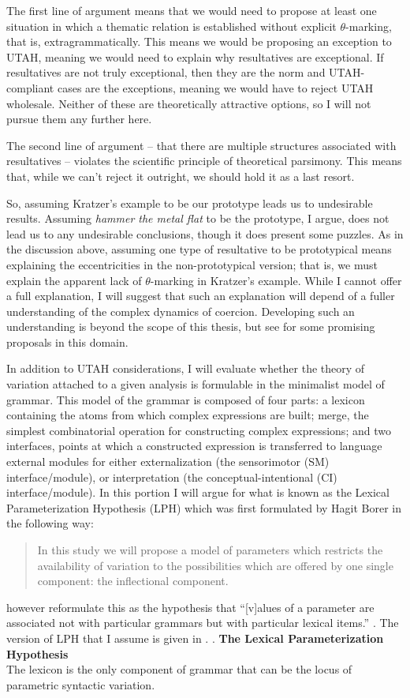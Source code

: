 \documentclass[MilwayThesis]{subfiles}
\begin{document}
The first line of argument means that we would need to propose at least one situation in which a thematic relation is established without explicit $\theta$-marking, that is, extragrammatically.
This means we would be proposing an exception to UTAH, meaning we would need to explain why resultatives are exceptional.
If resultatives are not truly exceptional, then they are the norm and UTAH-compliant cases are the exceptions, meaning we would have to reject UTAH wholesale.
Neither of these are theoretically attractive options, so I will not pursue them any further here.

The second line of argument -- that there are multiple structures associated with resultatives -- violates the scientific principle of theoretical parsimony.
This means that, while we can't reject it outright, we should hold it as a last resort.

So, assuming Kratzer's example to be our prototype leads us to undesirable results.
Assuming \textit{hammer the metal flat} to be the prototype, I argue, does not lead us to any undesirable conclusions, though it does present some puzzles.
As in the discussion above, assuming one type of resultative to be prototypical means explaining the eccentricities in the non-prototypical version;
that is, we must explain the apparent lack of $\theta$-marking in Kratzer's example.
While I cannot offer a full explanation, I will suggest that such an explanation will depend of a fuller understanding of the complex dynamics of coercion.
Developing such an understanding is beyond the scope of this thesis, but see \textcite{pustejovsky1998generative} for some promising proposals in this domain.

In addition to UTAH considerations, I will evaluate whether the theory of variation attached to a given analysis is formulable in the minimalist model of grammar.
This model of the grammar is composed of four parts:
	a lexicon containing the atoms from which complex expressions are built;
	merge, the simplest combinatorial operation for constructing complex expressions; 
	and two interfaces, points at which a constructed expression is transferred to language external modules for either externalization (the sensorimotor (SM) interface/module), or interpretation (the conceptual-intentional (CI) interface/module).
In this portion I will argue for what is known as the Lexical Parameterization Hypothesis (LPH) which was first formulated by Hagit Borer in the following way:
\begin{quote}
	In this study we will propose a model of parameters which restricts the availability of variation to the possibilities which are offered by one single component: the inflectional component. \parencite[3]{borer1984parametric}
\end{quote}
\textcite{manzini1987parameters} however reformulate this as the hypothesis that ``[v]alues of a parameter are associated not with particular grammars but with particular lexical items.'' \parencite[424]{manzini1987parameters}.
The version of LPH that I assume is given in \Next.
\ex. \textbf{The Lexical Parameterization Hypothesis}\\
The lexicon is the only component of grammar that can be the locus of parametric syntactic variation.
\end{document}
